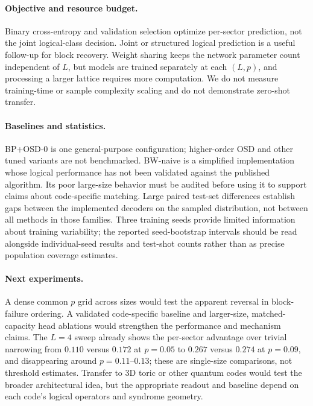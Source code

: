 \documentclass[11pt,a4paper]{article}
\begin{document}
\paragraph{Objective and resource budget.}
Binary cross-entropy and validation selection optimize per-sector
prediction, not the joint logical-class decision. Joint or structured
logical prediction is a useful follow-up for block recovery. Weight
sharing keeps the network parameter count independent of $L$, but models
are trained separately at each $(L,p)$, and processing a larger lattice
requires more computation. We do not measure training-time or sample
complexity scaling and do not demonstrate zero-shot transfer.

\paragraph{Baselines and statistics.}
BP+OSD-0 is one general-purpose configuration; higher-order OSD and other
tuned variants are not benchmarked. BW-naive is a simplified implementation
whose logical performance has not been validated against the published
algorithm. Its poor large-size behavior must be audited before using it
to support claims about code-specific matching. Large paired test-set
differences establish gaps between the implemented decoders on the sampled
distribution, not between all methods in those families. Three training
seeds provide limited information about training variability; the reported
seed-bootstrap intervals should be read alongside individual-seed results
and test-shot counts rather than as precise population coverage estimates.

\paragraph{Next experiments.}
A dense common $p$ grid across sizes would test the apparent reversal in
block-failure ordering. A validated code-specific baseline and larger-size,
matched-capacity head ablations would strengthen the performance and
mechanism claims. The $L=4$ sweep already shows the per-sector advantage
over trivial narrowing from $0.110$ versus $0.172$ at $p=0.05$ to $0.267$
versus $0.274$ at $p=0.09$, and disappearing around $p=0.11$--$0.13$;
these are single-size comparisons, not threshold estimates.
Transfer to 3D toric or other quantum codes would test the broader
architectural idea, but the appropriate readout and baseline depend on
each code's logical operators and syndrome geometry.
\end{document}
